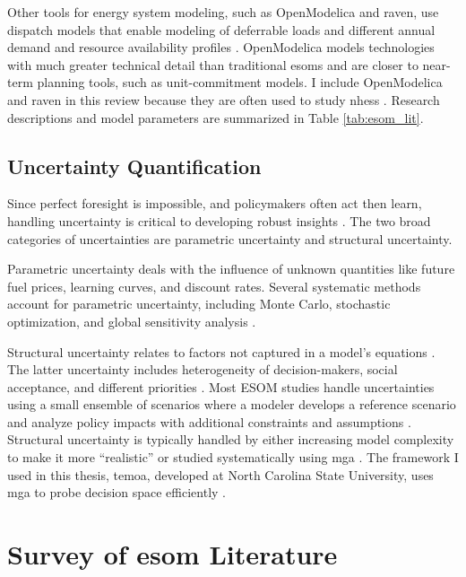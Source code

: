Other tools for energy system modeling, such as OpenModelica and \gls{raven},
use dispatch models that enable modeling of deferrable loads and different annual
demand and resource availability profiles \cite{baker_optimal_2018,epiney_economic_2020}.
OpenModelica models technologies with much greater technical detail than traditional
\glspl{esom} and are closer to near-term planning tools, such as unit-commitment
models. I include OpenModelica and
\gls{raven} in this review because they are often used to study \glspl{nhes}
\cite{baker_optimal_2018,garcia_dynamic_2016,epiney_economic_2020}.
Research descriptions and model parameters are summarized in Table \ref{tab:esom_lit}.

\subsection{Uncertainty Quantification}

Since perfect foresight is impossible, and policymakers often act then learn, handling
uncertainty is critical to developing robust insights
\cite{yue_review_2018, decarolis_modelling_2016}.
The two broad categories of uncertainties are parametric uncertainty and structural
uncertainty.

Parametric uncertainty deals with the influence of unknown quantities
like future fuel prices, learning curves, and discount rates. Several systematic methods account for parametric uncertainty, including Monte Carlo, stochastic optimization, and
global sensitivity analysis \cite{yue_review_2018}.

Structural uncertainty relates to factors not captured in a model’s equations
\cite{hunter_modeling_2013, yue_review_2018}. The latter uncertainty includes
heterogeneity of decision-makers,
social acceptance, and different priorities \cite{yue_review_2018}. Most ESOM
studies handle uncertainties using a small ensemble of scenarios where a modeler
develops a  reference scenario and analyze policy impacts with additional constraints
and assumptions \cite{yue_review_2018}.
Structural uncertainty is typically handled by either increasing model complexity
to make it more ``realistic'' or studied systematically using \gls{mga}
\cite{hunter_modeling_2013,decarolis_modelling_2016, yue_review_2018}.
The framework I used in this thesis, \gls{temoa}, developed at North Carolina
State University, uses \gls{mga} to probe decision space efficiently
\cite{decarolis_temoa_2010}.


\section{Survey of \gls{esom} Literature}

